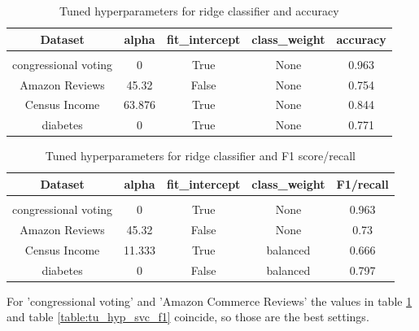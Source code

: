 \documentclass[a4paper,12pt]{article}
\begin{document}
\begin{table}[h!]
    \centering
    \begin{tabular}{|c|c|c|c|c|}
    \hline
    Dataset & \textsf{alpha} & \textsf{fit\_intercept} &  \textsf{class\_weight} &  accuracy \\
    \hline
    \multicolumn{5}{c}{\vspace{-0.4cm}} \\ %
    \hline
    congressional voting & 0 & True & None & 0.963 \\%
    \hline
    Amazon Reviews & 45.32 & False & None &  0.754 \\%
    \hline
    Census Income & 63.876 & True & None &  0.844 \\%
    \hline
    diabetes & 0 & True & None &  0.771 \\%
    \hline
    \end{tabular}
    \caption{Tuned hyperparameters for ridge classifier and accuracy} 
    \label{table:tu_hyp_ridge_ac}
    \end{table}

\begin{table}[h!]
    \centering
    \begin{tabular}{|c|c|c|c|c|}
    \hline
    Dataset & \textsf{alpha} & \textsf{fit\_intercept} &  \textsf{class\_weight} & F1/recall \\
    \hline
    \multicolumn{5}{c}{\vspace{-0.4cm}} \\ %
    \hline
    congressional voting & 0 & True & None & 0.963 \\%
    \hline
    Amazon Reviews & 45.32 & False & None &  0.73 \\%
    \hline
    Census Income & 11.333 & True & balanced & 0.666 \\%
    \hline
    diabetes & 0 & False & balanced & 0.797 \\%
    \hline
    \end{tabular}
    \caption{Tuned hyperparameters for ridge classifier and F1 score/recall} 
    \label{table:tu_hyp_ridge_f1}
    \end{table}

For 'congressional voting' and 'Amazon Commerce Reviews' the values in table \ref{table:tu_hyp_ridge_ac} and table \ref{table:tu_hyp_svc_f1} coincide, so those are the best settings. 
\end{document}
